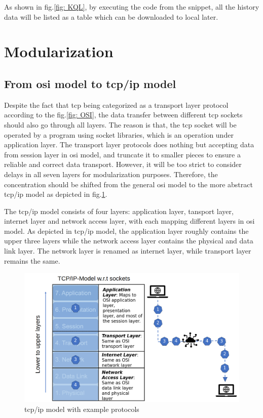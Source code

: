 As shown in fig.\ref{fig: KQL}, by executing the code from the snippet, all the history data will be listed as a table 
which can be downloaded to local later. 


\section{Modularization}\label{chap: Meth-Modular}
\subsection{From \gls{osi} model to \gls{tcp/ip} model}

Despite the fact that \gls{tcp} being categorized as a transport layer protocol 
according to the fig.\ref{fig: OSI}, the data transfer
between different \gls{tcp} sockets should also go through all layers. 
The reason is that, the \gls{tcp} socket will be operated by a program 
using socket libraries, which is an operation under application layer. 
The transport layer protocols does nothing but accepting data from session layer 
in \gls{osi} model, and truncate it to smaller pieces to ensure a reliable and correct
data transport. However, it will be too strict to consider delays in all seven 
layers for modularization purposes. Therefore, the concentration should be 
shifted from the general \gls{osi} model to the more abstract \gls{tcp/ip} model 
as depicted in fig.\ref{fig: TCP_IP}. 


The \gls{tcp/ip} model consists of four layers: application layer, tansport layer, 
internet layer and network access layer, with each mapping different layers in 
\gls{osi} model. As depicted in \gls{tcp/ip} model, 
the application layer roughly contains the upper three layers while the network access layer 
contains the physical and data link layer. The network layer is renamed as internet layer, 
while transport layer remains the same. 

\begin{figure}[htb]
    \includegraphics[width=\textwidth]{figures/TCP_IP.png}
    
    \centering
    \caption{\gls{tcp/ip} model with example protocols \label{fig: TCP_IP}}
\end{figure}
